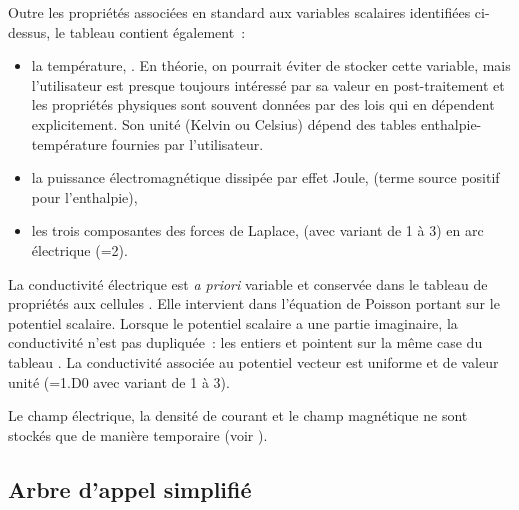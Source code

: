 \bigskip
Outre les propri\'et\'es associ\'ees en standard aux variables scalaires
identifi\'ees ci-dessus, le
tableau  contient \'egalement~:
 \begin{itemize} 
\item la temp\'erature, . En th\'eorie, on
	pourrait \'eviter de stocker cette variable, mais l'utilisateur est 
	presque toujours int\'eress\'e par sa valeur en post-traitement et 
	les propri\'et\'es physiques sont souvent donn\'ees par des lois qui en
	d\'ependent explicitement. 
	Son unit\'e (Kelvin ou Celsius) d\'epend des tables
	enthalpie-temp\'erature fournies par l'utilisateur.  
\item la puissance \'electromagn\'etique dissip\'ee par effet Joule,
	 (terme source positif pour l'enthalpie),
\item les trois composantes des forces de Laplace,  
	 (avec  variant de 1 \`a 3) 
        en arc \'electrique (=2). 
\end{itemize}

\bigskip
La conductivit\'e \'electrique est {\it a priori} variable et 
conserv\'ee dans le tableau de propri\'et\'es aux cellules 
. Elle intervient dans l'\'equation de
Poisson portant sur le potentiel scalaire. Lorsque le potentiel scalaire a une
partie imaginaire, la conductivit\'e n'est pas dupliqu\'ee~: 
les entiers  et  pointent sur la 
m\^eme case du tableau . La conductivit\'e associ\'ee au potentiel
vecteur est uniforme et de valeur unit\'e (=1.D0
avec  variant de 1 \`a 3). 

Le champ \'electrique, la densit\'e de courant et le champ magn\'etique ne sont
stock\'es que de mani\`ere temporaire (voir ).
 

\newpage

\subsection{Arbre d'appel simplifi\'e} 


